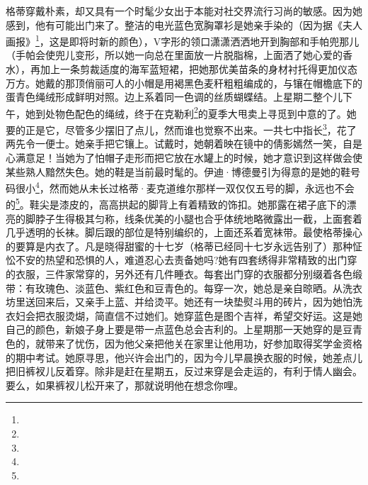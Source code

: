 \par 格蒂穿戴朴素，却又具有一个时髦少女出于本能对社交界流行习尚的敏感。因为她感到，他有可能出门来了。整洁的电光蓝色宽胸罩衫是她亲手染的（因为据《夫人画报》\footnote{}，这是即将时新的颜色），V字形的领口潇潇洒洒地开到胸部和手帕兜那儿（手帕会使兜儿变形，所以她一向总在里面放一片脱脂棉，上面洒了她心爱的香水），再加上一条剪裁适度的海军蓝短裙，把她那优美苗条的身材衬托得更加仪态万方。她戴的那顶俏丽可人的小帽是用褐黑色麦秆粗粗编成的，与镶在帽檐底下的蛋青色绳绒形成鲜明对照。边上系着同一色调的丝质蝴蝶结。上星期二整个儿下午，她到处物色配色的绳绒，终于在克勒利\footnote{}的夏季大甩卖上寻觅到中意的了。她要的正是它，尽管多少摆旧了点儿，然而谁也觉察不出来。一共七中指长\footnote{}，花了两先令一便士。她亲手把它镶上。试戴时，她朝着映在镜中的倩影嫣然一笑，自是心满意足！当她为了怕帽子走形而把它放在水罐上的时候，她才意识到这样做会使某些熟人黯然失色。她的鞋是当前最时髦的。伊迪·博德曼引为得意的是她的鞋号码很小\footnote{}，然而她从未长过格蒂·麦克道维尔那样一双仅仅五号的脚，永远也不会的\footnote{}。鞋尖是漆皮的，高高拱起的脚背上有着精致的饰扣。她那露在裙子底下的漂亮的脚脖子生得极其匀称，线条优美的小腿也合乎体统地略微露出一截，上面套着几乎透明的长袜。脚后跟的部位是特别编织的，上面还系着宽袜带。最使格蒂操心的要算是内衣了。凡是晓得甜蜜的十七岁（格蒂已经同十七岁永远告别了）那种怔忪不安的热望和恐惧的人，难道忍心去责备她吗?她有四套绣得非常精致的出门穿的衣服，三件家常穿的，另外还有几件睡衣。每套出门穿的衣服都分别缀着各色缎带：有玫瑰色、淡蓝色、紫红色和豆青色的。每穿一次，她总是亲自晾晒。从洗衣坊里送回来后，又亲手上蓝、并给烫平。她还有一块垫熨斗用的砖片，因为她怕洗衣妇会把衣服烫煳，简直信不过她们。她穿蓝色是图个吉祥，希望交好运。这是她自己的颜色，新娘子身上要是带一点蓝色总会吉利的。上星期那一天她穿的是豆青色的，就带来了忧伤，因为他父亲把他关在家里让他用功，好参加取得奖学金资格的期中考试。她原寻思，他兴许会出门的，因为今儿早晨换衣服的时候，她差点儿把旧裤衩儿反着穿。除非是赶在星期五，反过来穿是会走运的，有利于情人幽会。要么，如果裤衩儿松开来了，那就说明他在想念你哩。
